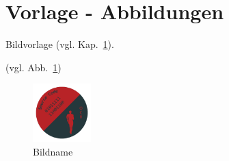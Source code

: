 \section{Vorlage - Abbildungen}\label{sec:vorlage_abb}

Bildvorlage (vgl. Kap.~\ref{sec:vorlage_abb}).

(vgl. Abb.~\ref{fig:bildname})
\begin{figure}[hb]%
	\centering
	\includegraphics[width=0.2\textwidth]{content/bsp/logo.pdf}
	\caption{Bildname}\label{fig:bildname}%
\end{figure}


